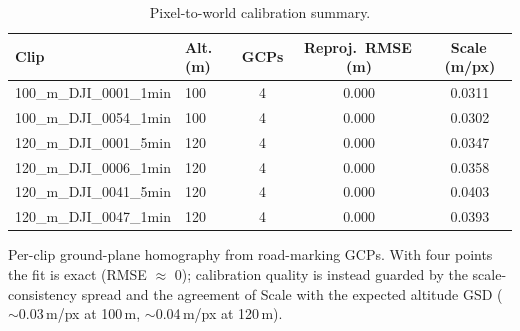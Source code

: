 \begin{table}[ht]
  \centering
  \caption{Pixel-to-world calibration summary.}
  \label{tab:calibration}
  \begin{tabular}{llccc}
    \toprule
    Clip & Alt.\,(m) & GCPs & Reproj.\ RMSE\,(m) & Scale\,(m/px) \\
    \midrule
    100\_m\_DJI\_0001\_1min & 100 & 4 & 0.000 & 0.0311 \\
    100\_m\_DJI\_0054\_1min & 100 & 4 & 0.000 & 0.0302 \\
    120\_m\_DJI\_0001\_5min & 120 & 4 & 0.000 & 0.0347 \\
    120\_m\_DJI\_0006\_1min & 120 & 4 & 0.000 & 0.0358 \\
    120\_m\_DJI\_0041\_5min & 120 & 4 & 0.000 & 0.0403 \\
    120\_m\_DJI\_0047\_1min & 120 & 4 & 0.000 & 0.0393 \\
    \bottomrule
  \end{tabular}
  \par\smallskip
  \footnotesize Per-clip ground-plane homography from road-marking GCPs. With four points the fit is exact (RMSE $\approx$ 0); calibration quality is instead guarded by the scale-consistency spread and the agreement of Scale with the expected altitude GSD ($\sim$0.03\,m/px at 100\,m, $\sim$0.04\,m/px at 120\,m).
\end{table}
